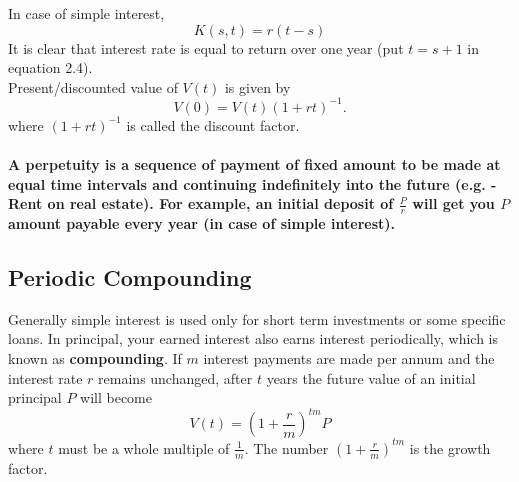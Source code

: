 In case of simple interest, \begin{equation} K(s,t)=r(t-s) \end{equation}
It is clear that interest rate is equal to return over one year (put $t=s+1$ in equation 2.4).
\\Present/discounted value of $V(t)$ is given by
\begin{equation}V(0)=V(t)(1+rt)^{-1}.\end{equation}
where $(1+rt)^{-1}$ is called the discount factor.
\paragraph{A perpetuity is a sequence of payment of fixed amount to be made at equal time intervals and continuing indefinitely into the future (e.g. -  Rent on real estate). For example, an initial deposit of $\frac{P}{r}$ will get you $P$ amount payable every year (in case of simple interest).}
\subsection{Periodic Compounding}
Generally simple interest is used only for short term investments or some specific loans. In principal, your earned interest also earns interest periodically, which is known as \textbf{compounding}. If $m$ interest payments are made per annum and the interest rate $r$ remains unchanged, after $t$ years the future value of an initial principal $P$ will become
\begin{equation}
    V(t)=(1+\frac{r}{m})^{tm} P
\end{equation}
where $t$ must be a whole multiple of $\frac{1}{m}$. The number $(1+\frac{r}{m})^{tm}$ is the growth factor.

